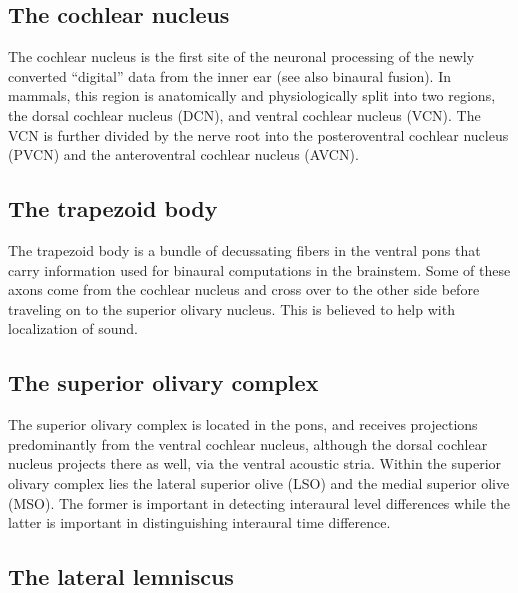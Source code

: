 \documentclass[]{book}
\begin{document}
\hypertarget{the-cochlear-nucleus}{%
\subsection{The cochlear nucleus}\label{the-cochlear-nucleus}}

The cochlear nucleus is the first site of the neuronal processing of the newly converted ``digital'' data from the inner ear (see also binaural fusion). In mammals, this region is anatomically and physiologically split into two regions, the dorsal cochlear nucleus (DCN), and ventral cochlear nucleus (VCN). The VCN is further divided by the nerve root into the posteroventral cochlear nucleus (PVCN) and the anteroventral cochlear nucleus (AVCN).

\hypertarget{the-trapezoid-body}{%
\subsection{The trapezoid body}\label{the-trapezoid-body}}

The trapezoid body is a bundle of decussating fibers in the ventral pons that carry information used for binaural computations in the brainstem. Some of these axons come from the cochlear nucleus and cross over to the other side before traveling on to the superior olivary nucleus. This is believed to help with localization of sound.

\hypertarget{the-superior-olivary-complex}{%
\subsection{The superior olivary complex}\label{the-superior-olivary-complex}}

The superior olivary complex is located in the pons, and receives projections predominantly from the ventral cochlear nucleus, although the dorsal cochlear nucleus projects there as well, via the ventral acoustic stria. Within the superior olivary complex lies the lateral superior olive (LSO) and the medial superior olive (MSO). The former is important in detecting interaural level differences while the latter is important in distinguishing interaural time difference.

\hypertarget{the-lateral-lemniscus}{%
\subsection{The lateral lemniscus}\label{the-lateral-lemniscus}}
\end{document}
